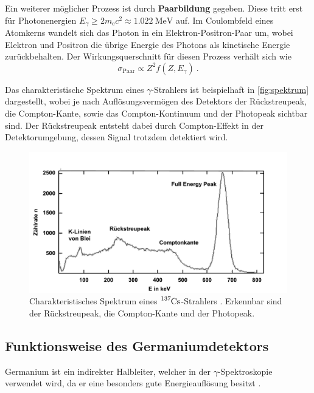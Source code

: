 Ein weiterer möglicher Prozess ist durch \textbf{Paarbildung} gegeben.
Diese tritt erst für Photonenergien $E_{\gamma} \geq 2 m_\text{e} c^2 \approx \SI{1.022}{\mega\eV}$ auf.
Im Coulombfeld eines Atomkerns wandelt sich das Photon in ein Elektron-Positron-Paar um,
wobei Elektron und Positron die übrige Energie des Photons als kinetische Energie zurückbehalten.
Der Wirkungsquerschnitt für diesen Prozess verhält sich wie
\begin{equation*}
    \sigma_\text{Paar} \propto Z^2 f(Z, E_{\gamma}) \ .
\end{equation*}

Das charakteristische Spektrum eines $\gamma$-Strahlers ist beispielhaft in \autoref{fig:spektrum} dargestellt,
wobei je nach Auflösungsvermögen des Detektors der Rückstreupeak,
die Compton-Kante,
sowie das Compton-Kontinuum und der Photopeak sichtbar sind.
Der Rückstreupeak entsteht dabei durch Compton-Effekt in der Detektorumgebung,
dessen Signal trotzdem detektiert wird.
\begin{figure}
    \centering
    \includegraphics[width=\textwidth]{content/img/cs137-spektrum_Leifi.pdf}
    \caption{
        Charakteristisches Spektrum eines $\ce{^137Cs}$-Strahlers \cite{caesium}.
        Erkennbar sind der Rückstreupeak,
        die Compton-Kante und der Photopeak.
    }
    \label{fig:spektrum}
\end{figure}


\subsection{Funktionsweise des Germaniumdetektors}
\label{sec:funktionsweise}

Germanium ist ein indirekter Halbleiter,
welcher in der $\gamma$-Spektroskopie verwendet wird,
da er eine besonders gute Energieauflösung besitzt \cite{kolanoskiwermes}.

